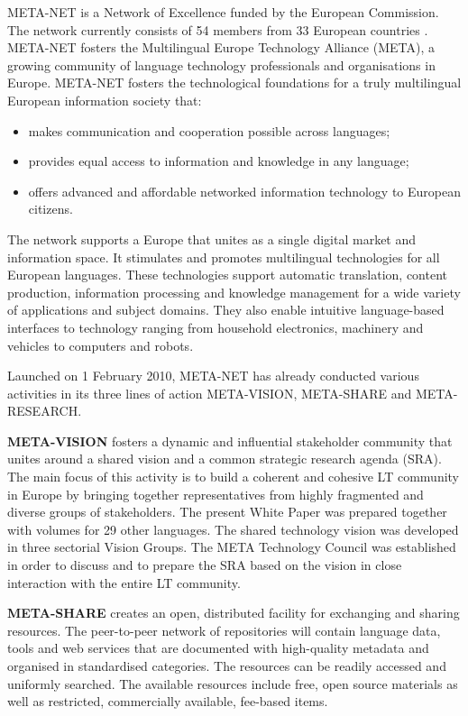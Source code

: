   \begin{multicols}{2}
  META-NET is a Network of Excellence funded by the European Commission. The network currently consists of 54 members from 33 European countries \cite{rehm2011}. META-NET fosters the Multilingual Europe Technology Alliance (META), a growing community of language technology professionals and organisations in Europe. META-NET fosters the technological foundations for a truly multilingual European information society that:

  \begin{itemize}
  \item makes communication and cooperation possible across languages;
  \item provides equal access to information and knowledge in any language;
  \item offers advanced and affordable networked information technology to European citizens.
  \end{itemize}

  The network supports a Europe that unites as a single digital market and information space. It stimulates and promotes multilingual technologies for all European languages. These technologies support automatic translation, content production, information processing and knowledge management for a wide variety of applications and subject domains. They also enable intuitive language-based interfaces to technology ranging from household electronics, machinery and vehicles to computers and robots.

  Launched on 1 February 2010, META-NET has already conducted various activities in its three lines of action META-VISION, META-SHARE and META-RESEARCH.

  \textbf{META-VISION} fosters a dynamic and influential stakeholder community that unites around a shared vision and a common strategic research agenda (SRA). The main focus of this activity is to build a coherent and cohesive LT community in Europe by bringing together representatives from highly fragmented and diverse groups of stakeholders. The present White Paper was prepared together with volumes for 29 other languages. The shared technology vision was developed in three sectorial Vision Groups. The META Technology Council was established in order to discuss and to prepare the SRA based on the vision in close interaction with the entire LT community. 

  \textbf{META-SHARE} creates an open, distributed facility for exchanging and sharing resources. The peer-to-peer network of repositories will contain language data, tools and web services that are documented with high-quality metadata and organised in standardised categories. The resources can be readily accessed and uniformly searched. The available resources include free, open source materials as well as restricted, commercially available, fee-based items.


\end{multicols}
